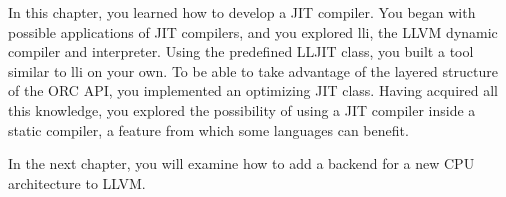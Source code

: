 In this chapter, you learned how to develop a JIT compiler. You began with possible applications of JIT compilers, and you explored lli, the LLVM dynamic compiler and interpreter. Using the predefined LLJIT class, you built a tool similar to lli on your own. To be able to take advantage of the layered structure of the ORC API, you implemented an optimizing JIT class. Having acquired all this knowledge, you explored the possibility of using a JIT compiler inside a static compiler, a feature from which some languages can benefit.\par

In the next chapter, you will examine how to add a backend for a new CPU architecture to LLVM.\par

\newpage